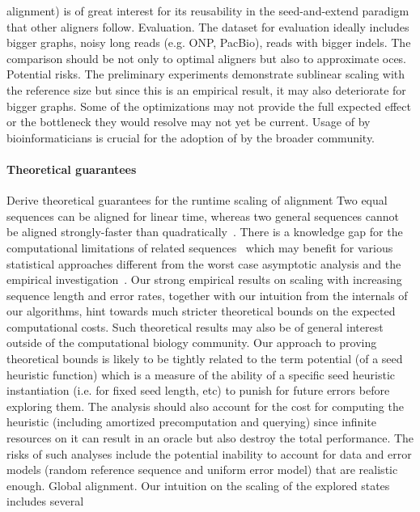 alignment) is of great interest for its reusability in the seed-and-extend
paradigm that other aligners follow. Evaluation. The dataset for evaluation
ideally includes bigger graphs, noisy long reads (e.g. ONP, PacBio), reads with
bigger indels. The comparison should be not only to optimal aligners but also to
approximate oces. Potential risks. The preliminary experiments demonstrate
sublinear scaling with the reference size but since this is an empirical result,
it may also deteriorate for bigger graphs. Some of the optimizations may not
provide the full expected effect or the bottleneck they would resolve may not
yet be current. Usage of \astarix by bioinformaticians is crucial for the
adoption of \astarix by the broader community.

\paragraph{Theoretical guarantees}
Derive theoretical guarantees for the runtime scaling of \A alignment Two equal
sequences can be aligned for linear time, whereas two general sequences cannot
be aligned strongly-faster than quadratically~\citep{backurs2015edit}. There is
a knowledge gap for the computational limitations of related
sequences~\citep{medvedev2022limitations} which may benefit for various
statistical approaches different from the worst case asymptotic analysis and the
empirical investigation~\citep{medvedev2022theoretical}. Our strong empirical
results on scaling with increasing sequence length and error rates, together
with our intuition from the internals of our \A algorithms, hint towards much
stricter theoretical bounds on the expected computational costs. Such
theoretical results may also be of general interest outside of the computational
biology community. Our approach to proving theoretical bounds is likely to be
tightly related to the term potential (of a seed heuristic function) which is a
measure of the ability of a specific seed heuristic instantiation (i.e. for
fixed seed length, etc) to punish for future errors before exploring them. The
analysis should also account for the cost for computing the heuristic (including
amortized precomputation and querying) since infinite resources on it can result
in an oracle but also destroy the total performance. The risks of such analyses
include the potential inability to account for data and error models (random
reference sequence and uniform error model) that are realistic enough. Global
alignment. Our intuition on the scaling of the explored states includes several
